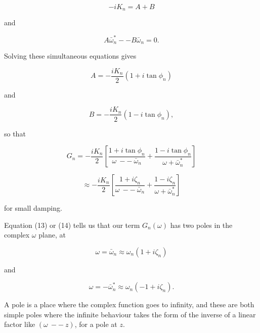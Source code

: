   \begin{equation*}-iK_n = A + B \tag{9}\end{equation*} 

  \noindent{}and 

  \begin{equation*}A \bar{\omega}^*_n -- B\bar{\omega}_n = 0 . 
  \tag{10}\end{equation*} 

  Solving these simultaneous equations gives 

  \begin{equation*}A = -\dfrac{iK_n}{2}(1+ i\tan \phi_n) 
  \tag{11}\end{equation*} 

  \noindent{}and 

  \begin{equation*}B = -\dfrac{iK_n}{2}(1- i\tan \phi_n) , 
  \tag{12}\end{equation*} 

  \noindent{}so that 

  \begin{equation*}G_n = -\dfrac{iK_n}{2} \left[\dfrac{1+ i\tan \phi_n}{\omega 
  \mathrm{~} -- \mathrm{~} \bar{\omega}_n} + \dfrac{1- i\tan \phi_n}{\omega + 
  \bar{\omega}^*_n} \right] \tag{13}\end{equation*} 

  \begin{equation*}\approx -\dfrac{iK_n}{2} \left[\dfrac{1+ i\zeta_n}{\omega 
  \mathrm{~} -- \mathrm{~} \bar{\omega}_n} + \dfrac{1- i\zeta_n}{\omega + 
  \bar{\omega}^*_n} \right] \tag{14}\end{equation*} 

  \noindent{}for small damping. 

  Equation (13) or (14) tells us that our term $G_n(\omega)$ has two poles in 
  the complex $\omega$ plane, at 

  \begin{equation*}\omega = \bar{\omega}_n \approx \omega_n(1 + i \zeta_n) 
  \tag{15}\end{equation*} 

  \noindent{}and 

  \begin{equation*}\omega = -\bar{\omega}_n^* \approx \omega_n(-1 + i \zeta_n) 
  . \tag{16}\end{equation*} 

  A pole is a place where the complex function goes to infinity, and these are 
  both simple poles where the infinite behaviour takes the form of the inverse 
  of a linear factor like $(\omega \mathrm{~} -- \mathrm{~} z)$, for a pole at 
  $z$. 

